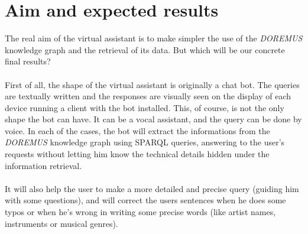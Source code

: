	\section{Aim and expected results}
	The real aim of the virtual assistant is to make simpler the use of the \textit{DOREMUS} knowledge graph and the retrieval of its data. But which will be our concrete final results?\\\\
	First of all, the shape of the virtual assistant is originally a chat bot. The queries are textually written and the responses are visually seen on the display of each device running a client with the bot installed. This, of course, is not the only shape the bot can have. It can be a vocal assistant, and the query can be done by voice. In each of the cases, the bot will extract the informations from the \textit{DOREMUS} knowledge graph using SPARQL queries, answering to the user's requests without letting him know the technical details hidden under the information retrieval.\\\\
	It will also help the user to make a more detailed and precise query (guiding him with some questions), and will correct the users sentences when he does some typos or when he's wrong in writing some precise words (like artist names, instruments or musical genres).
